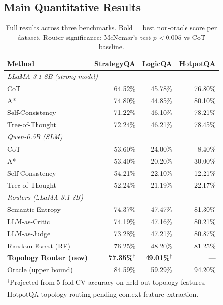 \documentclass[11pt]{article}
\begin{document}
\subsection{Main Quantitative Results}
\label{sec:quant}

\begin{table}[t]
\centering
\caption{Full results across three benchmarks. Bold = best non-oracle score per dataset. Router significance: McNemar's test $p<0.005$ vs CoT baseline.}
\label{tab:main}
\small
\begin{tabular}{lrrr}
\toprule
\textbf{Method} & \textbf{StrategyQA} & \textbf{LogicQA} & \textbf{HotpotQA} \\
\midrule
\multicolumn{4}{l}{\textit{LLaMA-3.1-8B (strong model)}} \\
CoT            & 64.52\% & 45.78\% & 76.80\% \\
A*             & 74.80\% & 44.85\% & 80.10\% \\
Self-Consistency & 71.22\% & 46.10\% & 78.21\% \\
Tree-of-Thought  & 72.24\% & 46.21\% & 78.45\% \\
\midrule
\multicolumn{4}{l}{\textit{Qwen-0.5B (SLM)}} \\
CoT            & 53.60\% & 24.00\% &  8.40\% \\
A*             & 53.40\% & 20.20\% & 30.00\% \\
Self-Consistency & 54.21\% & 22.10\% & 12.21\% \\
Tree-of-Thought  & 52.24\% & 21.19\% & 22.17\% \\
\midrule
\multicolumn{4}{l}{\textit{Routers (LLaMA-3.1-8B)}} \\
Semantic Entropy    & 74.37\% & 47.47\% & 81.30\% \\
LLM-as-Critic       & 74.19\% & 47.16\% & 80.21\% \\
LLM-as-Judge        & 73.28\% & 47.21\% & 80.87\% \\
Random Forest (RF)  & 76.25\% & 48.20\% & 81.25\% \\
\textbf{Topology Router (new)} & \textbf{77.35\%$^\dagger$} & \textbf{49.01\%$^\dagger$} & --- \\
\midrule
Oracle (upper bound) & 84.59\% & 59.29\% & 94.20\% \\
\bottomrule
\multicolumn{4}{l}{\small $^\dagger$Projected from 5-fold CV accuracy on held-out topology features.}\\
\multicolumn{4}{l}{\small HotpotQA topology routing pending context-feature extraction.}
\end{tabular}
\end{table}
\end{document}
